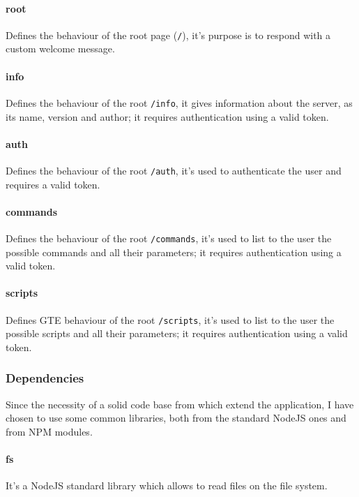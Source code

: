 \documentclass[../PiTest.tex]{subfiles}
\begin{document}
    \paragraph{root}
    Defines the behaviour of the root page (\texttt{/}), it's purpose is to respond with a custom welcome message.

    \paragraph{info}
    Defines the behaviour of the root \texttt{/info}, it gives information about the server, as its name, version and author; it requires authentication using a valid token.

    \paragraph{auth}
    Defines the behaviour of the root \texttt{/auth}, it's used to authenticate the user and requires a valid token.

    \paragraph{commands}
    Defines the behaviour of the root \texttt{/commands}, it's used to list to the user the possible commands and all their parameters; it requires authentication using a valid token.

    \paragraph{scripts}
    Defines GTE behaviour of the root \texttt{/scripts}, it's used to list to the user the possible scripts and all their parameters; it requires authentication using a valid token.

    \subsubsection{Dependencies}
    Since the necessity of a solid code base from which extend the application, I have chosen to use some common libraries, both from the standard NodeJS ones and from NPM modules.

    \paragraph{fs}
    It's a NodeJS standard library which allows to read files on the file system.
\end{document}
